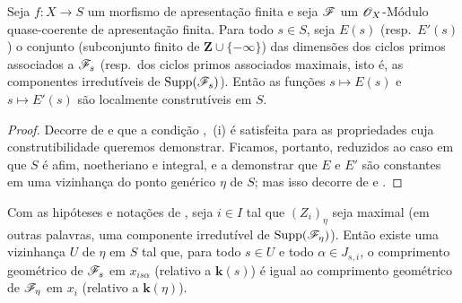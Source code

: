 \begin{proposition}[9.8.5]
\label{IV.9.8.5}
Seja $f:X\to S$ um morfismo de apresentação finita e seja $\mathscr{F}$ um $\mathscr{O}_X$-Módulo quase-coerente de apresentação finita.
Para todo $s\in S$, seja $E(s)$ (resp.~$E'(s)$) o conjunto (subconjunto finito de $\mathbf{Z}\cup\{-\infty\}$) das dimensões dos ciclos primos associados a $\mathscr{F}_s$ (resp.~dos ciclos primos associados maximais, isto é, as componentes irredutíveis de $\operatorname{Supp}(\mathscr{F}_s)$).
Então as funções $s\mapsto E(s)$ e $s\mapsto E'(s)$ são localmente construtíveis em $S$.
\end{proposition}

\begin{proof}
\label{IV.9.8.5-proof}
Decorre de  e  que a condição ,~(i) é satisfeita para as propriedades cuja construtibilidade queremos demonstrar.
Ficamos, portanto, reduzidos ao caso em que $S$ é afim, noetheriano e integral, e a demonstrar que $E$ e $E'$ são constantes em uma vizinhança do ponto genérico $\eta$ de $S$; mas isso decorre de  e .
\end{proof}

\begin{proposition}[9.8.6]
\label{IV.9.8.6}
Com as hipóteses e notações de \emph{}, seja $i\in I$ tal que $(Z_i)_\eta$ seja maximal (em outras palavras, uma componente irredutível de $\operatorname{Supp}(\mathscr{F}_\eta)$).
Então existe uma vizinhança $U$ de $\eta$ em $S$ tal que, para todo $s\in U$ e todo $\alpha\in J_{s,i}$, o comprimento geométrico de $\mathscr{F}_s$ em $x_{is\alpha}$ (relativo a $\mathbf{k}(s)$)  é igual ao comprimento geométrico de $\mathscr{F}_\eta$ em $x_i$ (relativo a $\mathbf{k}(\eta)$).
\end{proposition}

